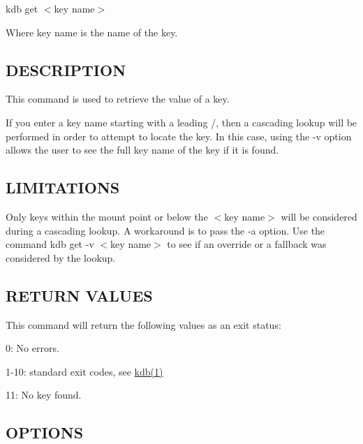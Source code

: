 {\ttfamily kdb get $<$key name$>$}

Where {\ttfamily key name} is the name of the key.

\subsection*{D\+E\+S\+C\+R\+I\+P\+T\+I\+ON}

This command is used to retrieve the value of a key.

If you enter a {\ttfamily key name} starting with a leading {\ttfamily /}, then a cascading lookup will be performed in order to attempt to locate the key. In this case, using the {\ttfamily -\/v} option allows the user to see the full key name of the key if it is found.

\subsection*{L\+I\+M\+I\+T\+A\+T\+I\+O\+NS}

Only keys within the mount point or below the {\ttfamily $<$key name$>$} will be considered during a cascading lookup. A workaround is to pass the {\ttfamily -\/a} option. Use the command {\ttfamily kdb get -\/v $<$key name$>$} to see if an override or a fallback was considered by the lookup.

\subsection*{R\+E\+T\+U\+RN V\+A\+L\+U\+ES}

This command will return the following values as an exit status\+:


\begin{DoxyItemize}
\item 0\+: No errors.
\item 1-\/10\+: standard exit codes, see \hyperlink{md_doc_help_kdb_doc_help_kdb_md}{kdb(1)}
\item 11\+: No key found.
\end{DoxyItemize}

\subsection*{O\+P\+T\+I\+O\+NS}


